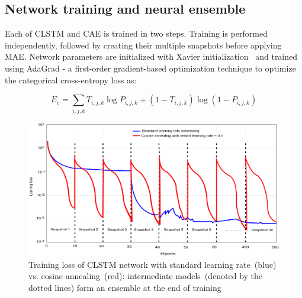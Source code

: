 \subsection{Network training and neural ensemble} %
Each of CLSTM and CAE is trained in two steps. Training is performed independently, followed by creating their multiple snapshots before applying MAE. Network parameters are initialized with Xavier initialization~\cite{xavier} and trained using AdaGrad - a first-order gradient-based optimization technique to optimize the categorical cross-entropy loss as: 

\vspace{-2mm}
\begin{equation} 
    E_{c} = \sum_{i, j, k} T_{i, j, k} \log P_{i, j, k}+\left(1-T_{i, j, k}\right) \log \left(1-P_{i, j, k}\right)
    \label{eq:cce3}
\end{equation} 

\begin{figure}
    \centering
    \includegraphics[scale=0.55]{images/cac.png}
    \caption[Cosine cyclic annealing-based training]{Training loss of CLSTM network with standard learning rate~(blue) vs. cosine annealing~(red): intermediate models~(denoted by the dotted lines) form an ensemble at the end of training~\cite{karimACCA2019}}
    \label{fig:ca}
    \vspace{-2mm}
\end{figure}


